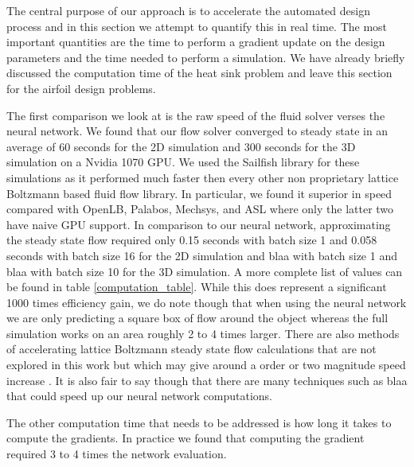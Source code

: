 \documentclass{article} %
\begin{document}
The central purpose of our approach is to accelerate the automated design process and in this section we attempt to quantify this in real time. The most important quantities are the time to perform a gradient update on the design parameters and the time needed to perform a simulation. We have already briefly discussed the computation time of the heat sink problem and leave this section for the airfoil design problems.

The first comparison we look at is the raw speed of the fluid solver verses the neural network. We found that our flow solver converged to steady state in an average of 60 seconds for the 2D simulation and 300 seconds for the 3D simulation on a Nvidia 1070 GPU. We used the Sailfish library \cite{januszewski2014sailfish} for these simulations as it performed much faster then every other non proprietary lattice Boltzmann based fluid flow library. In particular, we found it superior in speed compared with OpenLB, Palabos, Mechsys, and ASL where only the latter two have naive GPU support. In comparison to our neural network, approximating the steady state flow required only 0.15 seconds with batch size 1 and 0.058 seconds with batch size 16 for the 2D simulation and blaa with batch size 1 and blaa with batch size 10 for the 3D simulation. A more complete list of values can be found in table \ref{computation_table}. While this does represent a significant 1000 times efficiency gain, we do note though that when using the neural network we are only predicting a square box of flow around the object whereas the full simulation works on an area roughly 2 to 4 times larger. There are also methods of accelerating lattice Boltzmann steady state flow calculations that are not explored in this work but which may give around a order or two magnitude speed increase \cite{guo2013lattice} \cite{bernaschi2002computing}. It is also fair to say though that there are many techniques such as blaa that could speed up our neural network computations.

The other computation time that needs to be addressed is how long it takes to compute the gradients. In practice we found that computing the gradient required 3 to 4 times the network evaluation.
\end{document}
